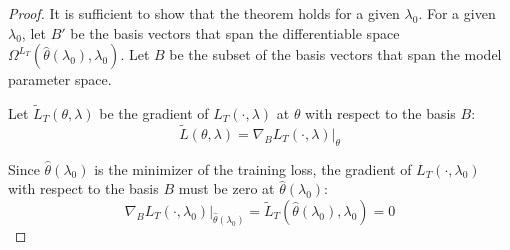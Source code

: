 \documentclass[10pt,letterpaper]{article}
\begin{document}
\begin{proof}
It is sufficient to show that the theorem holds for a given $\lambda_0$. For a given $\lambda_0$, let $B'$ be the basis vectors that span the differentiable space $\Omega^{L_T}(\hat \theta(\lambda_0), \lambda_0)$. Let $B$ be the subset of the basis vectors that span the model parameter space.

Let $\tilde L_T(\theta, \lambda)$ be the gradient of $L_T(\cdot, \lambda)$ at $\theta$ with respect to the basis $B$:
\begin{equation}
\tilde L(\theta, \lambda) = \nabla_{B} L_T(\cdot, \lambda) |_\theta
\end{equation}

Since $\hat \theta(\lambda_0)$ is the minimizer of the training loss, the gradient of $L_T(\cdot, \lambda_0)$ with respect to the basis $B$ must be zero at $\hat \theta(\lambda_0)$:
\begin{equation}
\nabla_{B} L_T(\cdot, \lambda_0)|_{\hat \theta(\lambda_0)} = \tilde L_T(\hat \theta(\lambda_0), \lambda_0) = 0
\end{equation}


\end{proof}
\end{document}
